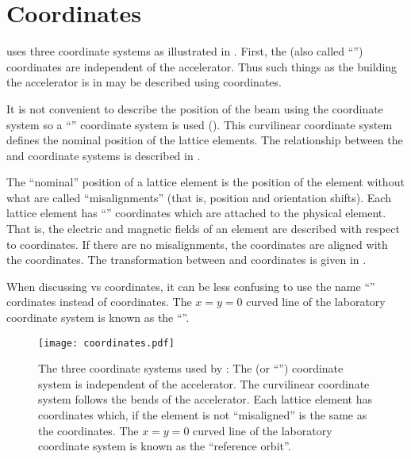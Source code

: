 \chapter{Coordinates}
\label{s:coords.3}

\vspace*{-0.3in}
\bmad uses three coordinate systems as illustrated in . First, the  (also
called ``'') coordinates are independent of the accelerator. Thus such things as the
building the accelerator is in may be described using  coordinates.

It is not convenient to describe the position of the beam using the  coordinate system so
a ``'' coordinate system is used ().  This curvilinear coordinate
system defines the nominal position of the lattice elements.  The relationship between the
 and  coordinate systems is described in .

The ``nominal'' position of a lattice element is the position of the element without what are called
``misalignments'' (that is, position and orientation shifts). Each lattice element has ``'' coordinates which are attached to the physical element. That is, the electric and magnetic
fields of an element are described with respect to  coordinates.  If there are no
misalignments, the  coordinates are aligned with the  coordinates. The
transformation between  and  coordinates is given in
.

When discussing  vs  coordinates, it can be less confusing to use the name
``'' cordinates instead of  coordinates. The $x=y=0$ curved line of the
laboratory coordinate system is known as the ``''.

\begin{figure}[!b]
  \centering
  \texttt{[image: coordinates.pdf]}
  \caption[The three coordinate system used by \bmad.]
{The three coordinate systems used by \bmad: The  (or ``'') coordinate system
is independent of the accelerator.  The  curvilinear coordinate system follows the bends
of the accelerator.  Each lattice element has  coordinates which, if the element is
not ``misaligned'' is the same as the  coordinates. The $x=y=0$ curved line of the
laboratory coordinate system is known as the ``reference orbit''.}
  \label{f:coords}
\end{figure}

